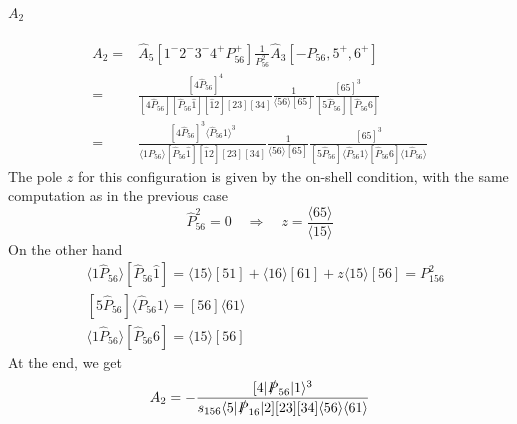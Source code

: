 \paragraph{$A_2$}
\begin{equation*}
\begin{split}
A_2 = & \hat{A}_5[1^-2^-3^-4^+ P_{56}^+]\frac{1}{P_{56}^2}\hat{A}_3[-P_{56},5^+,6^+]
\\
= &
\frac{[4\hat{P}_{56}]^4}{[4\hat{P}_{56}][\hat{P}_{56}\hat{1}][\hat{1}2][23][34]}\frac{1}{\langle 56\rangle [65]}\frac{[65]^3}{[5\hat{P}_{56}][\hat{P}_{56}6]}
\\
= &
\frac{[4\hat{P}_{56}]^3\langle\hat{P}_{56}1\rangle^3}{\langle 1P_{56}\rangle [\hat{P}_{56}\hat{1}][\hat{1}2][23][34]}\frac{1}{\langle 56\rangle [65]}\frac{[65]^3}{[5\hat{P}_{56}]\langle \hat{P}_{56} 1\rangle [\hat{P}_{56} 6]\langle 1\hat{P}_{56}\rangle}
\end{split}
\end{equation*}
The pole $z$ for this configuration is given by the on-shell condition, with the same computation as in the previous case
\begin{equation*}
\hat{P}_{56}^2 = 0 \quad\Rightarrow\quad
z=\frac{\langle 65\rangle}{\langle 15\rangle}
\end{equation*}
On the other hand
\begin{equation*}
\begin{split}
& \langle 1\hat{P}_{56}\rangle [\hat{P}_{56}\hat{1}] = \langle 15 \rangle[51] + \langle 16\rangle[61] + z\langle 15 \rangle[56] = P_{156}^2
\\
& [5\hat{P}_{56}]\langle\hat{P}_{56} 1 \rangle = [56]\langle 61\rangle
\\
&
\langle 1 \hat{P}_{56}\rangle[\hat{P}_{56}6] =\langle 15\rangle[56]
\end{split}
\end{equation*}
At the end, we get
\begin{equation*}
A_2 = -\frac{[4|\slashed{P}_{56}|1\rangle^3}{s_{156}\langle 5|\slashed{P}_{16}|2][23][34]\langle 56\rangle\langle 61\rangle}
\end{equation*}


